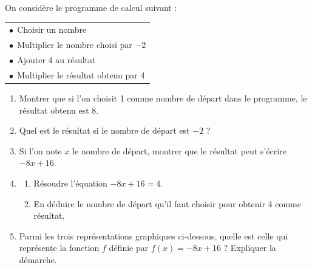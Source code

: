 \documentclass[exercice,a4]{thedocument}%
\begin{document}
%
\medskip

On considère le programme de calcul suivant :

\begin{center}
\begin{tabular}{|l|}\hline
$\bullet~~$Choisir un nombre\\
$\bullet~~$Multiplier le nombre choisi par $-2$\\
$\bullet~~$Ajouter 4 au résultat\\
$\bullet~~$Multiplier le résultat obtenu par 4\\ \hline
\end{tabular}
\end{center}

\smallskip

\begin{enumerate}
\item Montrer que si l'on choisit 1 comme nombre de départ dans le programme, le résultat obtenu est 8.
\item Quel est le résultat si le nombre de départ est $- 2$ ?
\item Si l'on note $x$ le nombre de départ, montrer que le résultat peut s'écrire $-8x + 16$.
\item 
	\begin{enumerate}
		\item Résoudre l'équation $-8x + 16 = 4$.
		\item En déduire le nombre de départ qu'il faut choisir pour obtenir 4 comme résultat.
	\end{enumerate}
\item Parmi les trois représentations graphiques ci-dessous, quelle est celle qui représente la fonction $f$ définie par $f(x) =-8x + 16$ ? Expliquer la démarche.


\end{enumerate}
\end{document}
